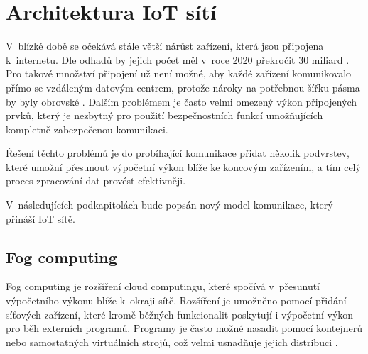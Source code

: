 \section{Architektura IoT sítí}
  V~blízké době se očekává stále větší nárůst zařízení, která jsou připojena k~internetu.
  Dle odhadů by jejich počet měl v~roce 2020 překročit 30 miliard \cite{iotDevices}.
  Pro takové množství připojení už není možné, aby každé zařízení komunikovalo přímo
  se vzdáleným datovým centrem, protože nároky na potřebnou šířku pásma by byly 
  obrovské \cite{fog}.
  Dalším problémem je často velmi omezený výkon připojených prvků, který je nezbytný pro 
  použití bezpečnostních funkcí umožňujících kompletně zabezpečenou komunikaci. 
  
  Řešení těchto problémů je do probíhající komunikace přidat několik podvrstev, 
  které umožní přesunout výpočetní výkon blíže ke koncovým zařízením, a tím celý
  proces zpracování dat provést efektivněji.
  
  V~následujících podkapitolách bude popsán nový model komunikace, který přináší 
  IoT sítě.
 \subsection{Fog computing} 
 Fog computing je rozšíření cloud computingu, které spočívá v~přesunutí výpočetního
 výkonu blíže k~okraji sítě. Rozšíření je umožněno pomocí přidání síťových zařízení,
 které kromě běžných funkcionalit poskytují i výpočetní výkon pro běh externích programů. Programy 
 je často možné nasadit pomocí kontejnerů nebo samostatných virtuálních strojů, což 
 velmi usnadňuje jejich distribuci \cite{fog}.
 
